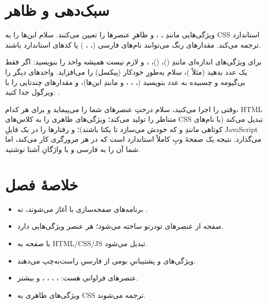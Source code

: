 \section{سبک‌دهی و ظاهر}

ویژگی‌هایی مانندِ ، ،  و
 ظاهرِ عنصرها را تعیین می‌کنند. سلام این‌ها را به CSSِ
استاندارد ترجمه می‌کند. مقدارهای رنگ می‌توانند نام‌های فارسی (،
، ) یا کدهای استاندارد باشند.

\begin{tip}
برای ویژگی‌های اندازه‌ای مانندِ  ()،
 ()، ،  و 
لازم نیست همیشه واحد را بنویسید: اگر فقط یک عدد بدهید (مثلاً
)، سلام
به‌طورِ خودکار  (پیکسل) را می‌افزاید. واحدهای دیگر را بی‌گیومه و
چسبیده به عدد بنویسید (، ، ، \code{\%}
و مانندِ این‌ها)، و مقدارهای چندتایی را با ویرگول جدا کنید:
.
\end{tip}

\begin{deep}
وقتی  را اجرا می‌کنید، سلام درختِ عنصرهای شما را
می‌پیماید و برای هر کدام، HTMLِ متناظر را تولید می‌کند؛ ویژگی‌های ظاهری را به
کلاس‌های CSS تبدیل می‌کند (با نام‌های کوتاهی مانندِ  و
 که خودش می‌سازد تا یکتا باشند)؛ و رفتارها را در یک فایلِ JavaScript می‌گذارد. نتیجه یک
صفحهٔ وبِ کاملاً استاندارد است که در هر مرورگری کار می‌کند، اما شما آن را به
فارسی و با واژگانِ آشنا نوشتید.
\end{deep}

\section{خلاصهٔ فصل}

\begin{itemize}
  \item برنامه‌های صفحه‌سازی با  آغاز می‌شوند، نه .
  \item صفحه از عنصرهای تودرتو ساخته می‌شود؛ هر عنصر ویژگی‌هایی دارد.
  \item با  صفحه به HTML/CSS/JS تبدیل می‌شود.
  \item ویژگی‌های  و  پشتیبانیِ بومی از فارسیِ راست‌به‌چپ
        می‌دهند.
  \item عنصرهای فراوانی هست: ، ، ،
        ،  و بیشتر.
  \item ویژگی‌های ظاهری به CSS ترجمه می‌شوند.
\end{itemize}

